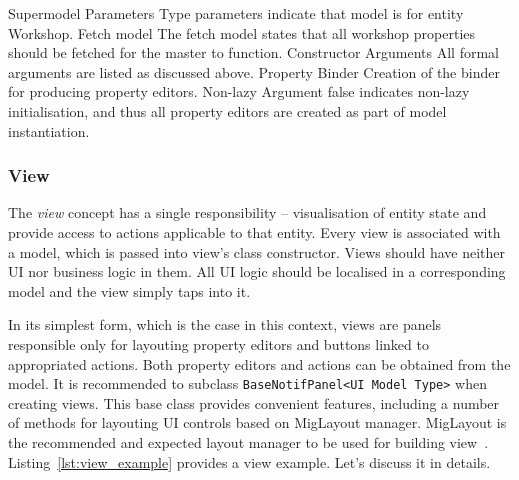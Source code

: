     {Supermodel Parameters}
    {Type parameters indicate that model is for entity Workshop.}
    {Fetch model}
    {The fetch model states that all workshop properties should be fetched for the master to function.}
    {Constructor Arguments}
    {All formal arguments are listed as discussed above.}
    {Property Binder}
    {Creation of the binder for producing property editors.}
    {Non-lazy}
    {Argument false indicates non-lazy initialisation, and thus all property editors are created as part of model instantiation.}    
  
  \subsubsection{View}
  
  The \emph{view} concept has a single responsibility -- visualisation of entity state and provide access to actions applicable to that entity.
  Every view is associated with a model, which is passed into view's class constructor.
  Views should have neither UI nor business logic in them.
  All UI logic should be localised in a corresponding model and the view simply taps into it.
  
  In its simplest form, which is the case in this context, views are panels responsible only for layouting property editors and buttons linked to appropriated actions.
  Both property editors and actions can be obtained from the model.  
  It is recommended to subclass \texttt{BaseNotifPanel<UI Model Type>} when creating views.
  This base class provides convenient features, including a number of methods for layouting UI controls based on MigLayout manager.
  MigLayout is the recommended and expected layout manager to be used for building view~\cite{MigLayout}.
  Listing~\ref{lst:view_example} provides a view example.
  Let's discuss it in details.  
  
